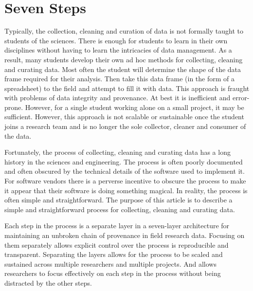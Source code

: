 \documentclass[12pt,a4paper]{article}
\title{\documenttitle}
\subtitle{A Seven-Layer Architecture for Maintaining an Unbroken Chain of Provenance in Field Research}
\author{\authorname}
\date{\today}
\begin{document}
\maketitle

\begin{abstract}
  Write a concise summary of the article here.
\end{abstract}

\tableofcontents

\clearpage
\section{Seven Steps}

Typically,
the collection, cleaning and curation of data is not formally taught
to students of the sciences.
There is enough for students to learn in their own disciplines
without having to learn the intricacies of data management.
As a result, many students develop their own ad hoc methods for
collecting, cleaning and curating data.
Most often
the student will determine the shape of the data frame required for their analysis.
Then take this data frame
(in the form of a spreadsheet)
to the field and attempt to fill it with data.
This approach is fraught with problems of data integrity and provenance.
At best it is inefficient and error-prone.
However,
for a single student working alone on a small project,
it may be sufficient.
However, this approach is
not scalable or sustainable
once the student joins a research team
and is no longer the sole collector, cleaner and consumer of the data.

Fortunately, the process of collecting, cleaning and curating data
has a long history in the sciences and engineering.
The process is often poorly documented
and often obscured by the technical details of the software used to implement it.
For software vendors there is a perverse incentive to obscure the process
to make it appear that their software is doing something magical.
In reality, the process is often simple and straightforward.
The purpose of this article is to describe a simple and straightforward process
for collecting, cleaning and curating data.

Each step in the process is a separate layer in a seven-layer architecture
for maintaining an unbroken chain of provenance in field research data.
Focusing on them separately allows explicit control over the process
is reproducible and transparent.
Separating the layers allows for the process to be scaled and sustained
across multiple researchers and multiple projects.
And allows researchers to focus effectively on each step in the process
without being distracted by the other steps.
\end{document}
